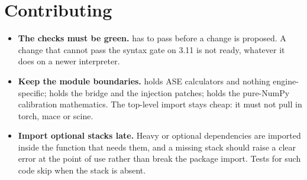 \section{Contributing}
\label{sec:dev-contributing}

\begin{itemize}
  \item \textbf{The checks must be green.}  
        has to pass before a change is proposed.  A change that cannot pass
        the syntax gate on 3.11 is not ready, whatever it does on a newer
        interpreter.
  \item \textbf{Keep the module boundaries.}  
        holds ASE calculators and nothing engine-specific;
         holds the bridge and the injection patches;
         holds the pure-NumPy calibration mathematics.
        The top-level import stays cheap: it must not pull in torch, mace or
        scine.
  \item \textbf{Import optional stacks late.}  Heavy or optional
        dependencies are imported inside the function that needs them, and a
        missing stack should raise a clear error at the point of use rather
        than break the package import.  Tests for such code skip when the
        stack is absent.
\end{itemize}
